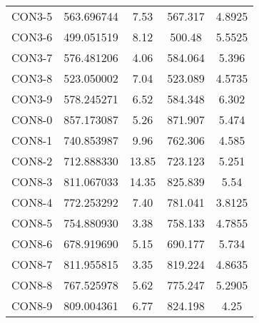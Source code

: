 \begin{table}[ht]
\begin{tabular}{c c c c c}
CON3-5 & 563.696744 & 7.53 & 567.317 & 4.8925 \\
CON3-6 & 499.051519 & 8.12 & 500.48 & 5.5525 \\
CON3-7 & 576.481206 & 4.06 & 584.064 & 5.396 \\
CON3-8 & 523.050002 & 7.04 & 523.089 & 4.5735 \\
CON3-9 & 578.245271 & 6.52 & 584.348 & 6.302 \\
CON8-0 & 857.173087 & 5.26 & 871.907 & 5.474 \\
CON8-1 & 740.853987 & 9.96 & 762.306 & 4.585 \\
CON8-2 & 712.888330 & 13.85 & 723.123 & 5.251 \\
CON8-3 & 811.067033 & 14.35 & 825.839 & 5.54 \\
CON8-4 & 772.253292 & 7.40 & 781.041 & 3.8125 \\
CON8-5 & 754.880930 & 3.38 & 758.133 & 4.7855 \\
CON8-6 & 678.919690 & 5.15 & 690.177 & 5.734 \\
CON8-7 & 811.955815 & 3.35 & 819.224 & 4.8635 \\
CON8-8 & 767.525978 & 5.62 & 775.247 & 5.2905 \\
CON8-9 & 809.004361 & 6.77 & 824.198 & 4.25 \\
[1ex]\hline
\end{tabular}
\label{table:nonlin}
\end{table} \clearpage
